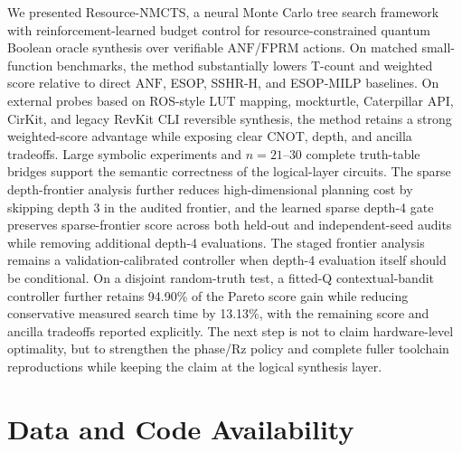 \documentclass[11pt]{article}
\newcommand{\method}{Resource-NMCTS}
\newcommand{\anf}{\ensuremath{\mathrm{ANF}}}
\newcommand{\fprm}{\ensuremath{\mathrm{FPRM}}}
\begin{document}
We presented \method{}, a neural Monte Carlo tree search framework with
reinforcement-learned budget control for
resource-constrained quantum Boolean oracle synthesis over verifiable
\anf{}/\fprm{} actions.  On matched small-function benchmarks, the method
substantially lowers T-count and weighted score relative to direct \anf{},
ESOP, SSHR-H, and ESOP-MILP baselines.  On external probes based on
ROS-style LUT mapping, mockturtle, Caterpillar API, CirKit, and legacy RevKit
CLI reversible synthesis, the method retains a strong weighted-score advantage
while exposing clear CNOT, depth, and ancilla tradeoffs.  Large symbolic experiments and
$n=21$--$30$ complete truth-table bridges support the semantic correctness of
the logical-layer circuits.  The sparse depth-frontier analysis further reduces
high-dimensional planning cost by skipping depth 3 in the audited frontier, and
the learned sparse depth-4 gate preserves sparse-frontier score across both
held-out and independent-seed audits while removing additional depth-4
evaluations.  The staged frontier analysis remains a validation-calibrated
controller when depth-4 evaluation itself should be conditional.  On a
disjoint random-truth test, a fitted-Q contextual-bandit controller further
retains 94.90\% of the Pareto score gain while reducing conservative measured
search time by 13.13\%, with the remaining score and ancilla tradeoffs reported
explicitly.  The next step is not to
claim hardware-level
optimality, but to strengthen the phase/Rz policy and complete fuller
toolchain reproductions while keeping the claim at the logical synthesis
layer.

\section*{Data and Code Availability}
\end{document}
